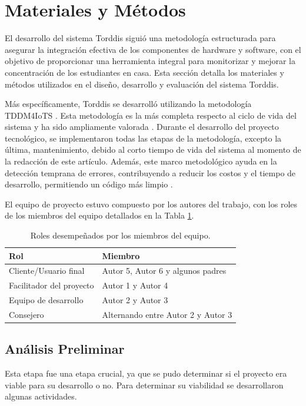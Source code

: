 \documentclass[a4paper,fleqn]{cas-sc}
\begin{document}
	\section{Materiales y Métodos}
	\label{seccion:Cuatro}
		El desarrollo del sistema Torddis siguió una metodología estructurada para asegurar la integración efectiva de los componentes de hardware y software, con el objetivo de proporcionar una herramienta integral para monitorizar y mejorar la concentración de los estudiantes en casa. Esta sección detalla los materiales y métodos utilizados en el diseño, desarrollo y evaluación del sistema Torddis.
		
		Más específicamente, Torddis se desarrolló utilizando la metodología TDDM4IoTS \citep{Guerrero-Ulloa2020TDDM4IoTS}. Esta metodología es la más completa respecto al ciclo de vida del sistema \citep{Guerrero-Ulloa2023Review} y ha sido ampliamente valorada \citep{Guerrero-Ulloa2023DevIdeAir,Guerrero-Ulloa2023IdeAir,Guerrero-Ulloa2023SP4,Guerrero-Ulloa2023Nawi}. Durante el desarrollo del proyecto tecnológico, se implementaron todas las etapas de la metodología, excepto la última, mantenimiento, debido al corto tiempo de vida del sistema al momento de la redacción de este artículo. Además, este marco metodológico ayuda en la detección temprana de errores, contribuyendo a reducir los costos y el tiempo de desarrollo, permitiendo un código más limpio \citep{Beck2002TDD}.
		
		El equipo de proyecto estuvo compuesto por los autores del trabajo, con los roles de los miembros del equipo detallados en la Tabla \ref{tab:Roles}.
		
		\begin{table}[H]
			\caption{Roles desempeñados por los miembros del equipo.\label{tab:Roles}}
			\begin{tabularx}{0.8\textwidth}{>{\arraybackslash}X >{\arraybackslash}X}
				\toprule
				\textbf{Rol}	& \textbf{Miembro}\\
				\midrule
				Cliente/Usuario final & Autor 5, Autor 6 y algunos padres\\
				Facilitador del proyecto		&  Autor 1 y Autor 4\\
				Equipo de desarrollo		&  Autor 2 y Autor 3\\
				Consejero		&  Alternando entre Autor 2 y Autor 3\\
				\bottomrule
			\end{tabularx}
		\end{table}
		
		\subsection{Análisis Preliminar}
			Esta etapa fue una etapa crucial, ya que se pudo determinar si el proyecto era viable para su desarrollo o no. Para determinar su viabilidad se desarrollaron algunas actividades.
			
\end{document}
